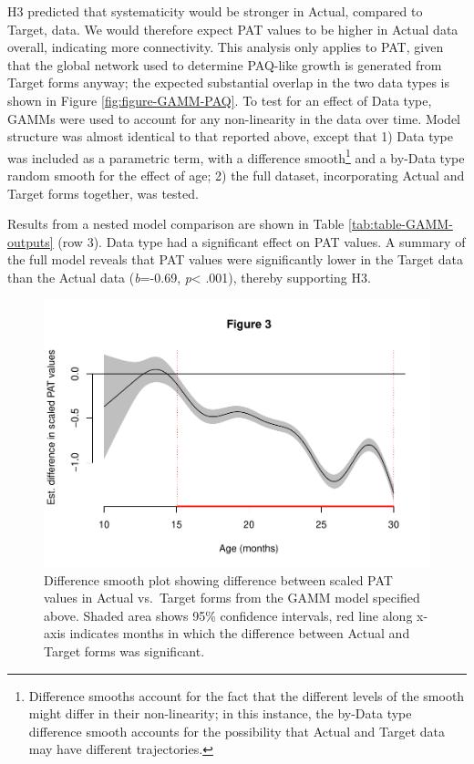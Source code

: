 \documentclass[
  man]{apa6}
\begin{document}
H3 predicted that systematicity would be stronger in Actual, compared to Target, data. We would therefore expect PAT values to be higher in Actual data overall, indicating more connectivity. This analysis only applies to PAT, given that the global network used to determine PAQ-like growth is generated from Target forms anyway; the expected substantial overlap in the two data types is shown in Figure \ref{fig:figure-GAMM-PAQ}. To test for an effect of Data type, GAMMs were used to account for any non-linearity in the data over time. Model structure was almost identical to that reported above, except that 1) Data type was included as a parametric term, with a difference smooth\footnote{Difference smooths account for the fact that the different levels of the smooth might differ in their non-linearity; in this instance, the by-Data type difference smooth accounts for the possibility that Actual and Target data may have different trajectories.} and a by-Data type random smooth for the effect of age; 2) the full dataset, incorporating Actual and Target forms together, was tested.

Results from a nested model comparison are shown in Table \ref{tab:table-GAMM-outputs} (row 3). Data type had a significant effect on PAT values. A summary of the full model reveals that PAT values were significantly lower in the Target data than the Actual data (\emph{b}=-0.69, \emph{p}\textless{} .001), thereby supporting H3.

\begin{figure}
\centering
\includegraphics{PhonNetworksProj_files/figure-latex/difference-smooth-data-type-1.pdf}
\caption{\label{fig:difference-smooth-data-type}Difference smooth plot showing difference between scaled PAT values in Actual vs.~Target forms from the GAMM model specified above. Shaded area shows 95\% confidence intervals, red line along x-axis indicates months in which
the difference between Actual and Target forms was significant.}
\end{figure}
\end{document}
